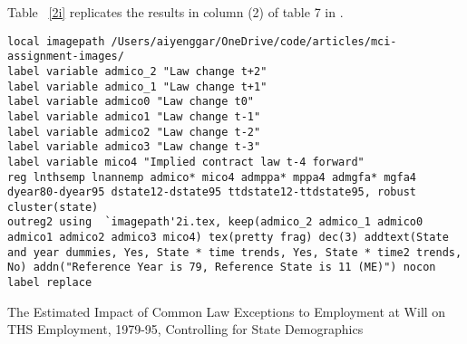 \documentclass[12pt]{article}
\begin{document}
\noindent Table ~\ref{2i} replicates the results in column (2) of table 7 in \cite{Autor2003}. 

\begin{lstlisting}
local imagepath /Users/aiyenggar/OneDrive/code/articles/mci-assignment-images/
label variable admico_2 "Law change t+2"
label variable admico_1 "Law change t+1"
label variable admico0 "Law change t0"
label variable admico1 "Law change t-1"
label variable admico2 "Law change t-2"
label variable admico3 "Law change t-3"
label variable mico4 "Implied contract law t-4 forward"
reg lnthsemp lnannemp admico* mico4 admppa* mppa4 admgfa* mgfa4 dyear80-dyear95 dstate12-dstate95 ttdstate12-ttdstate95, robust cluster(state)
outreg2 using  `imagepath'2i.tex, keep(admico_2 admico_1 admico0 admico1 admico2 admico3 mico4) tex(pretty frag) dec(3) addtext(State and year dummies, Yes, State * time trends, Yes, State * time2 trends, No) addn("Reference Year is 79, Reference State is 11 (ME)") nocon label replace
\end{lstlisting}

\begin{table}
\caption{The Estimated Impact of Common Law Exceptions to Employment at Will on THS Employment, 1979-95, Controlling for State Demographics}

\label{2i}
\end{table}


\newpage
 

\end{document}
